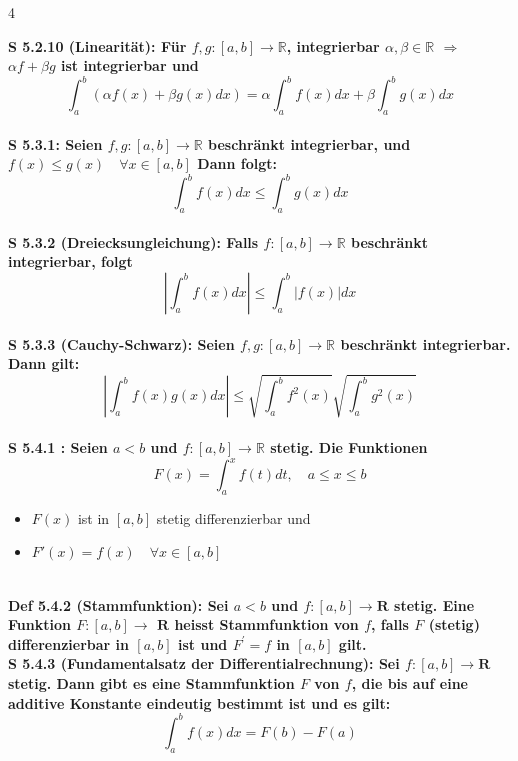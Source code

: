 \documentclass[7pt,landscape, margin = 0.1mm]{article}
\newcommand{\DEF}[2]{\color{chaptercolor}\bf{Def #1}:\color{black}    \hspace{0.2cm} #2 \\}
\newcommand{\SA}[2]{\color{chaptercolor}\bf{S #1}:\color{black}    \hspace{0.2cm} #2 \\}
\begin{document}
\begin{multicols}{4}
\begin{flushleft}
\SA{5.2.10 (Linearität)}{Für $f,g:[a,b] \longrightarrow \mathbb{R}$, integrierbar $\alpha,\beta\in \mathbb{R}$
$\Rightarrow$ $\alpha f+ \beta g$ ist integrierbar und
$$ \int_{a}^{b} \left(\alpha f(x)+\beta g(x) dx \right) = \alpha\int_{a}^{b} f(x) dx + \beta \int_{a}^{b} g(x) dx  $$}
\SA{5.3.1}{Seien $f,g:[a,b] \longrightarrow \mathbb{R}$ beschränkt integrierbar, und $f(x) \leq g(x) \quad \forall x \in [a,b]$
Dann folgt:
$$ \int_{a}^{b} f(x)dx \leq \int_{a}^{b} g(x)dx $$}
\SA{5.3.2 (Dreiecksungleichung)}{Falls $f:[a,b] \longrightarrow \mathbb{R}$ beschränkt integrierbar, folgt
$$ \left| \int_{a}^{b} f(x)dx \right| \leq \int_{a}^{b} |f(x)|dx $$}
\SA{5.3.3 (Cauchy-Schwarz)}{Seien $f,g:[a,b] \longrightarrow \mathbb{R}$ beschränkt integrierbar. Dann gilt:
$$ \left| \int_{a}^{b}f(x)g(x)dx \right| \leq \sqrt{ \int_{a}^{b} f^2(x) } \sqrt{\int_{a}^{b} g^2(x)} $$}
\SA{5.4.1 }{Seien $a<b$ und $f:[a,b] \longrightarrow \mathbb{R}$ stetig. Die Funktionen
$$ F(x) = \int_{a}^{x} f(t) dt, \quad a\leq x \leq b $$
\begin{itemize}
\item $F(x)$ ist in $[a,b]$ stetig differenzierbar und
\item $F'(x) = f(x) \quad \forall x \in [a,b]$\end{itemize}}
\DEF{5.4.2 (Stammfunktion)}{Sei $a<b$ und $f:[a, b] \longrightarrow \mathbf{R}$ stetig. Eine Funktion $F:[a, b] \longrightarrow$ $\mathbf{R}$ heisst Stammfunktion von $f$, falls $F$ (stetig) differenzierbar in $[a, b]$ ist und $F^{\prime}=f$ in $[a, b]$ gilt.}
\SA{5.4.3 (Fundamentalsatz der Differentialrechnung)}{Sei $f:[a, b] \longrightarrow \mathbf{R}$ stetig. Dann gibt es eine Stammfunktion $F$ von $f$, die bis auf eine additive Konstante eindeutig bestimmt ist und es gilt:
$$
\int_a^b f(x) d x=F(b)-F(a)
$$}


\end{flushleft}
\end{multicols}
\end{document}
